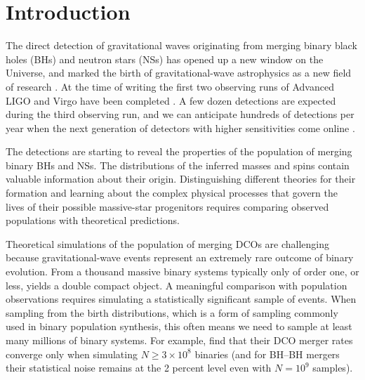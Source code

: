 \documentclass[a4paper,fleqn,usenatbib,useAMS,usedcolumn]{mnras}
\begin{document}




\section{Introduction}
\label{sec:introduction}
%

The direct detection of gravitational waves  originating from merging binary black holes (BHs) and neutron stars (NSs) has opened up a new window on the Universe, and marked the birth of gravitational-wave astrophysics as a new field of research \citep[][]{PhysRevLett.116.061102, PhysRevLett.119.161101}. At the time of writing the first two observing runs of Advanced LIGO and Virgo have been completed \citep{2018arXiv181112907T}. A few dozen detections are expected during the third observing run, and we can anticipate hundreds of detections per year when the next generation of detectors with higher sensitivities come online \citep{2018LRR....21....3A}.

The detections are starting to reveal the properties of the population of merging binary BHs and NSs.  The distributions of the inferred masses and spins contain valuable information about their origin. 
Distinguishing different theories for their formation and learning about the complex physical processes that govern the lives of their possible massive-star progenitors requires comparing observed populations with theoretical predictions.  

Theoretical simulations of the population of merging DCOs are challenging because gravitational-wave events represent an extremely rare outcome of binary evolution.  
From a thousand massive binary systems typically only of order one, or less, yields a double compact object. A meaningful comparison with population observations requires simulating a statistically significant sample of events.  When sampling from the birth distributions, which is a form of sampling commonly used in binary population synthesis, this often means we need to sample at least many millions of binary systems. For example, \citet{kruckow2018progenitors} find  that  their DCO merger rates converge only when simulating $N \geq 3 \times 10^8$ binaries (and for BH--BH mergers their statistical noise remains at the 2 percent level even with $N=10^9$ samples).  
\end{document}
